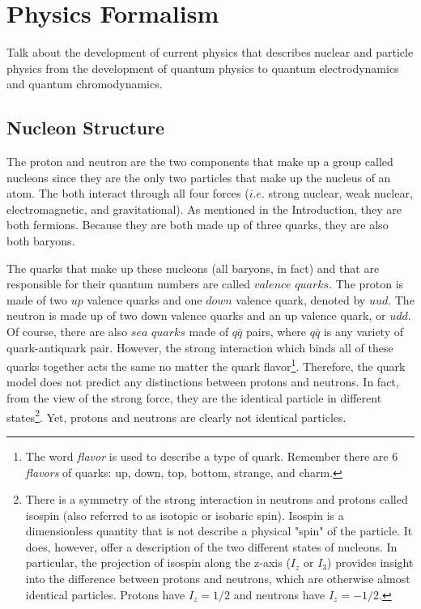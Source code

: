\chapter{Physics Formalism}
\label{ch:physrev}
Talk about the development of current physics that describes nuclear and particle physics from the development of quantum physics to quantum electrodynamics and quantum chromodynamics.

\section{Nucleon Structure}
The proton and neutron are the two components that make up a group called nucleons since they are the only two particles that make up the nucleus of an atom. The both interact through all four forces ($i.e.$ strong nuclear, weak nuclear, electromagnetic, and gravitational). As mentioned in the Introduction, they are both fermions. Because they are both made up of three quarks, they are also both baryons.

The quarks that make up these nucleons (all baryons, in fact) and that are responsible for their quantum numbers are called $valence$ $quarks$. The proton is made of two $up$ valence quarks and one $down$ valence quark, denoted by $uud$. The neutron is made up of two down valence quarks and an up valence quark, or $udd$. Of course, there are also $sea$ $quarks$ made of $q\bar{q}$ pairs, where $q\bar{q}$ is any variety of quark-antiquark pair. However, the strong interaction which binds all of these quarks together acts the same no matter the quark flavor\footnote{The word \textit{flavor} is used to describe a type of quark. Remember there are 6 \textit{flavors} of quarks: up, down, top, bottom, strange, and charm.}. Therefore, the quark model does not predict any distinctions between protons and neutrons. In fact, from the view of the strong force, they are the identical particle in different states\footnote{There is a symmetry of the strong interaction in neutrons and protons called isospin (also referred to as isotopic or isobaric spin). Isospin is a dimensionless quantity that is not describe a physical "spin" of the particle. It does, however, offer a description of the two different states of nucleons. In particular, the projection of isospin along the z-axis ($I_z$ or $I_3$) provides insight into the difference between protons and neutrons, which are otherwise almost identical particles. Protons have $I_z=1/2$ and neutrons have $I_z=-1/2$.}. Yet, protons and neutrons are clearly not identical particles.

